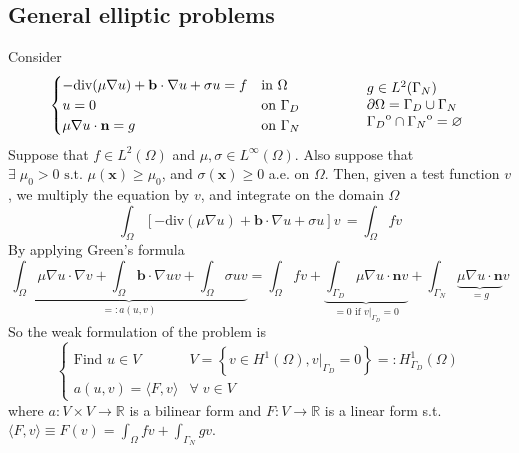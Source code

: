 \documentclass[a4paper,12pt]{article}
\theoremstyle{break}
\renewcommand*{\grad}{\nabla}
\renewcommand*{\div}{\text{div}}
\newcommand{\vect}[1]{\textbf{#1}}
\let\emptyset\varnothing
\newcommand*{\txt}[1]{\text{#1}}
\renewcommand{\real}{\mathbb{R}}
\newcommand{\scalarproduct}[2]{\langle #1,#2 \rangle}
\newcommand{\interior}[1]{%
 {\kern0pt#1}^{\mathrm{o}}%
}
\numberwithin{equation}{section}
\begin{document}
\subsection*{General elliptic problems}
Consider 
\begin{equation}
    \begin{cases}
        -\div(\mu \grad u)+ \vect{b}\cdot \grad u + \sigma u = f& \text{in } \Omega \\
        u = 0 & \txt{on }\Gamma_D \\
        \mu \grad u \cdot \vect{n} = g & \txt{on } \Gamma_N
    \end{cases}
    \qquad\qquad
    \begin{array}{l}
        g \in L^2(\Gamma_N) \\
        \partial\Omega = \Gamma_D \cup \Gamma_N \\
        \interior{\Gamma_D} \cap \interior{\Gamma_N} = \emptyset
    \end{array}
\end{equation}
Suppose that \(f \in L^2(\Omega)\) and \(\mu, \sigma \in L^\infty(\Omega)\). Also suppose that \(\exists \; \mu_0 > 0 \txt{ s.t. } \mu(\vect{x}) \geq \mu_0\), and \(\sigma(\vect{x}) \geq 0\) a.e. on \(\Omega\).  
Then, given a test function \(v\), we multiply the equation by \(v\), and integrate on the domain \(\Omega\)
\begin{equation*}
    \int_\Omega \left[-\div(\mu \grad u)+ \vect{b}\cdot \grad u + \sigma u\right] v \,  = \int_\Omega f v 
\end{equation*}
By applying Green's formula 
\begin{equation*}
    \underbrace{\int_\Omega \mu\grad u \cdot \grad v  + \int_\Omega \vect{b} \cdot \grad u v + \int_\Omega \sigma u v}_{=: a(u,v)} = \int_\Omega f v +\underbrace{\int_{\Gamma_D} \mu \grad u \cdot \vect{n} v}_{= 0 \txt{ if } v\vert_{\Gamma_D} = 0} + \int_{\Gamma_N} \underbrace{\mu \grad u \cdot \vect{n}}_{= g} v 
\end{equation*}
So the weak formulation of the problem is 
\begin{equation}
    \begin{cases}
        \txt{Find } u \in V & V = \left\{v \in H^1(\Omega), v\vert_{\Gamma_D} = 0\right\} =: H^1_{\Gamma_D}(\Omega)\\
        a(u,v) = \scalarproduct{F}{v} & \forall \; v \in V \label{Weak Formulation of Boundary Value Problems}
    \end{cases}
\end{equation}
where \(a: V \times V \to \real\) is a bilinear form and \(F:V \to \real\) is a linear form s.t. \(\scalarproduct{F}{v} \equiv F(v) = \int_\Omega fv + \int_{\Gamma_N} gv\).
\end{document}
